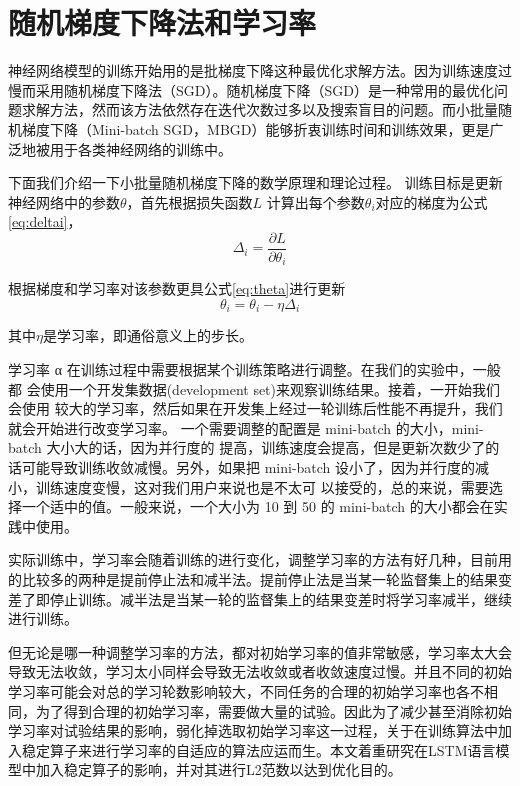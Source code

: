 \section{随机梯度下降法和学习率}

神经网络模型的训练开始用的是批梯度下降这种最优化求解方法。因为训练速度过慢而采用随机梯度下降法（SGD）\cite{lecun1998efficient}。随机梯度下降（SGD）是一种常用的最优化问题求解方法，然而该方法依然存在迭代次数过多以及搜索盲目的问题。而小批量随机梯度下降（Mini-batch SGD，MBGD）能够折衷训练时间和训练效果，更是广泛地被用于各类神经网络的训练中\cite{konevcny2016mini}。

下面我们介绍一下小批量随机梯度下降的数学原理和理论过程。
训练目标是更新神经网络中的参数$\theta$，首先根据损失函数$L$ 计算出每个参数$\theta_i$对应的梯度为公式\ref{eq:deltai}，
\begin{equation}
	\label{eq:deltai}
   	{\Delta _i} = \frac{{\partial L}}{{\partial {\theta _i}}}
\end{equation} 

根据梯度和学习率对该参数更具公式\ref{eq:theta}进行更新
\begin{equation}
	\label{eq:theta}
   	{\theta_i} = {\theta_i} - \eta {\Delta_i}
\end{equation} 
	 
其中$\eta$是学习率，即通俗意义上的步长。

学习率 α 在训练过程中需要根据某个训练策略进行调整。在我们的实验中，一般都 会使用一个开发集数据(development set)来观察训练结果。接着，一开始我们会使用 较大的学习率，然后如果在开发集上经过一轮训练后性能不再提升，我们就会开始进行改变学习率。
一个需要调整的配置是 mini-batch 的大小，mini-batch 大小大的话，因为并行度的 提高，训练速度会提高，但是更新次数少了的话可能导致训练收敛减慢。另外，如果把 mini-batch 设小了，因为并行度的减小，训练速度变慢，这对我们用户来说也是不太可 以接受的，总的来说，需要选择一个适中的值。一般来说，一个大小为 10 到 50 的 mini-batch 的大小都会在实践中使用。

实际训练中，学习率会随着训练的进行变化，调整学习率的方法有好几种，目前用的比较多的两种是提前停止法\cite{yao2007early}和减半法\cite{goodfellow2016deep}。提前停止法是当某一轮监督集上的结果变差了即停止训练。减半法是当某一轮的监督集上的结果变差时将学习率减半，继续进行训练。

	但无论是哪一种调整学习率的方法，都对初始学习率的值非常敏感，学习率太大会导致无法收敛，学习太小同样会导致无法收敛或者收敛速度过慢。并且不同的初始学习率可能会对总的学习轮数影响较大，不同任务的合理的初始学习率也各不相同，为了得到合理的初始学习率，需要做大量的试验。因此为了减少甚至消除初始学习率对试验结果的影响，弱化掉选取初始学习率这一过程，关于在训练算法中加入稳定算子来进行学习率的自适应的算法应运而生。本文着重研究在LSTM语言模型中加入稳定算子的影响，并对其进行L2范数以达到优化目的。
    

